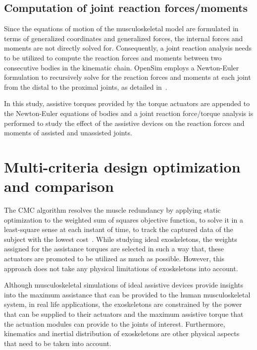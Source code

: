 \documentclass[10pt,letterpaper]{article}
\begin{document}


\subsection*{Computation of joint reaction forces/moments} Since the equations of motion of the musculoskeletal model are formulated in terms of generalized coordinates and generalized forces, the internal forces and moments are not directly solved for. Consequently, a joint reaction analysis needs to be utilized to compute the reaction forces and moments between two consecutive bodies in the kinematic chain.  OpenSim employs a  Newton-Euler formulation to recursively solve for  the reaction forces and moments at each joint from the distal to the proximal joints, as detailed in~\cite{Steele2012}.

In this study, assistive torques provided by the torque actuators are appended to the Newton-Euler equations of bodies and a joint reaction force/torque analysis is performed to study the effect of the assistive devices on the reaction forces and moments of assisted and unassisted joints.


\section*{Multi-criteria design optimization and comparison}

The CMC algorithm resolves the muscle redundancy by applying static optimization to the weighted sum of squares objective function, to solve it in a least-square sense at each instant of time, to track the captured data of the subject with the lowest cost~\cite{Hicks2015}. While studying ideal exoskeletons, the weights assigned for the assistance torques are selected in such a way that, these actuators are promoted to be utilized as much as possible. However, this approach does not take any physical limitations of exoskeletons into account.

Although musculoskeletal simulations of ideal assistive devices provide insights into the maximum assistance that can be provided to the human musculoskeletal system, in real life applications, the exoskeletons are constrained by the power that can be supplied to their actuators and the maximum assistive torque that the actuation modules can provide to the joints of interest. Furthermore, kinematics and inertial distribution of exoskeletons are other physical aspects that need to be taken into account.
\end{document}
